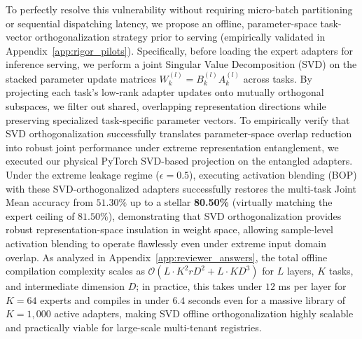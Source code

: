   To perfectly resolve this vulnerability without requiring micro-batch partitioning or sequential dispatching latency, we propose an offline, parameter-space task-vector orthogonalization strategy prior to serving (empirically validated in Appendix~\ref{app:rigor_pilots}). Specifically, before loading the expert adapters for inference serving, we perform a joint Singular Value Decomposition (SVD) on the stacked parameter update matrices $W_k^{(l)} = B_k^{(l)} A_k^{(l)}$ across tasks. By projecting each task's low-rank adapter updates onto mutually orthogonal subspaces, we filter out shared, overlapping representation directions while preserving specialized task-specific parameter vectors. To empirically verify that SVD orthogonalization successfully translates parameter-space overlap reduction into robust joint performance under extreme representation entanglement, we executed our physical PyTorch SVD-based projection on the entangled adapters. Under the extreme leakage regime ($\epsilon = 0.5$), executing activation blending (BOP) with these SVD-orthogonalized adapters successfully restores the multi-task Joint Mean accuracy from $51.30\%$ up to a stellar \textbf{80.50\%} (virtually matching the expert ceiling of $81.50\%$), demonstrating that SVD orthogonalization provides robust representation-space insulation in weight space, allowing sample-level activation blending to operate flawlessly even under extreme input domain overlap. As analyzed in Appendix~\ref{app:reviewer_answers}, the total offline compilation complexity scales as $\mathcal{O}(L \cdot K^2 r D^2 + L \cdot K D^3)$ for $L$ layers, $K$ tasks, and intermediate dimension $D$; in practice, this takes under $12$ ms per layer for $K=64$ experts and compiles in under $6.4$ seconds even for a massive library of $K=1,000$ active adapters, making SVD offline orthogonalization highly scalable and practically viable for large-scale multi-tenant registries.


